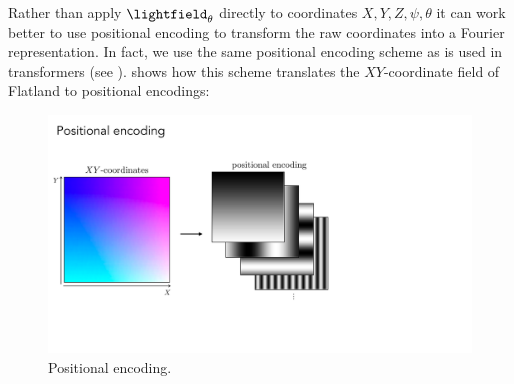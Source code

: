 Rather than apply $\lightfield_{\theta}$ directly to coordinates $X,Y,Z,\psi,\theta$ it can work better to use positional encoding to transform the raw coordinates into a Fourier representation. In fact, we use the same positional encoding scheme as is used in transformers (see \sect{\ref{sec:transformers:positional_encodings}}). \Fig{\ref{fig:nerfs:flatland_positional_encoding}} shows how this scheme translates the $XY$-coordinate field of Flatland to positional encodings:
\begin{figure}[h!]
    \centerline{
    \includegraphics[width=0.7\linewidth]{figures/nerfs/flatland_positional_encoding.pdf}
    }
    \caption{Positional encoding.}
    \label{fig:nerfs:flatland_positional_encoding}
\end{figure}


